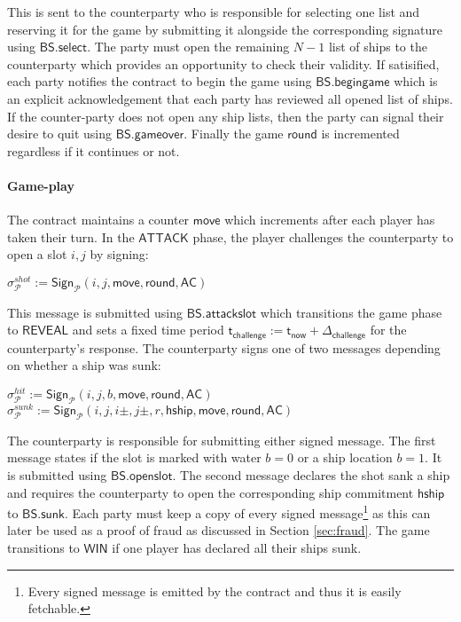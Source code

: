 \documentclass{llncs}
\newcommand{\gameattack}{\mathsf{ATTACK}}
\newcommand{\gamereveal}{\mathsf{REVEAL}}
\newcommand{\gamewinner}{\mathsf{WIN}}
\newcommand{\hship}{\mathsf{hship}}
\newcommand{\participant}{\mathcal{P}}
\newcommand{\sign}{\mathsf{Sign}}
\newcommand{\battleshipattackslot}{\mathsf{BS.attackslot}}
\newcommand{\battleshipbegin}{\mathsf{BS.begingame}}
\newcommand{\battleshipselectboard}{\mathsf{BS.select}}
\newcommand{\battleshiprevealslot}{\mathsf{BS.openslot}}
\newcommand{\battleshipsinking}{\mathsf{BS.sunk}}
\newcommand{\battleshipgameover}{\mathsf{BS.gameover}}
\newcommand{\appcontract}{\mathsf{AC}}
\newcommand{\timerchallenge}{\mathsf{\Delta}_{\mathsf{challenge}}}
\newcommand{\timechallenge}{\mathsf{t}_{\mathsf{challenge}}}
\newcommand{\timenow}{\mathsf{t}_{\mathsf{now}}}
\begin{document}
This is sent to the counterparty who is responsible for selecting one list and reserving it for the game by submitting it alongside the corresponding signature using $\battleshipselectboard$. 
The party must open the remaining $N-1$ list of ships to the counterparty which provides an opportunity to check their validity. 
If satisified, each party notifies the contract to begin the game using $\battleshipbegin$ which is an explicit acknowledgement that each party has reviewed all opened list of ships.
If the counter-party does not open any ship lists, then the party can signal their desire to quit  using $\battleshipgameover$.
Finally the game $\mathsf{round}$ is incremented regardless if it continues or not. 

\paragraph{Game-play} \label{sec:gameplayships}
The contract maintains a counter $\mathsf{move}$ which increments after each player has taken their turn. 
In the $\gameattack$ phase, the player challenges the counterparty to open a slot $i,j$ by signing: 

\begin{center}
	$\sigma^{shot}_{\participant} := \sign_{\participant}(i,j, \mathsf{move}, \mathsf{round},\appcontract)$ \\
\end{center}

This message is submitted using $\battleshipattackslot$ which transitions the game phase to $\gamereveal$ and sets a fixed time period $\timechallenge := \timenow + \timerchallenge$ for the counterparty's response. 
The counterparty signs one of two messages depending on whether a ship was sunk:

\begin{center}
	$\sigma^{hit}_{\participant} := \sign_{\participant}(i,j,b,\mathsf{move}, \mathsf{round},\appcontract)$ \\ $\sigma^{sunk}_{\participant} := \sign_{\participant}(i,j,i\pm,j\pm,r,\hship,\mathsf{move}, \mathsf{round},\appcontract)$
\end{center}

The counterparty is responsible for submitting either signed message. 
The first message states if the slot is marked with water $b=0$ or a ship location $b=1$.
It is submitted using $\battleshiprevealslot$.
The second message declares the shot sank a ship and requires the counterparty to open the corresponding ship commitment $\hship$ to $\battleshipsinking$. 
Each party must keep a copy of every signed message\footnote{Every signed message is emitted by the contract and thus it is easily fetchable.} as this can later be used as a proof of fraud as discussed in Section \ref{sec:fraud}.
The game transitions to $\gamewinner$ if one player has declared all their ships sunk. 
\end{document}
